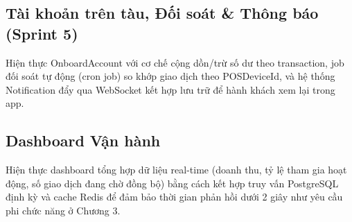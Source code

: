 \subsection{Tài khoản trên tàu, Đối soát \& Thông báo (Sprint 5)}
Hiện thực OnboardAccount với cơ chế cộng dồn/trừ số dư theo transaction,
job đối soát tự động (cron job) so khớp giao dịch theo POSDeviceId, và
hệ thống Notification đẩy qua WebSocket kết hợp lưu trữ để hành khách xem
lại trong app.

\subsection{Dashboard Vận hành}
Hiện thực dashboard tổng hợp dữ liệu real-time (doanh thu, tỷ lệ tham gia
hoạt động, số giao dịch đang chờ đồng bộ) bằng cách kết hợp truy vấn
PostgreSQL định kỳ và cache Redis để đảm bảo thời gian phản hồi dưới 2
giây như yêu cầu phi chức năng ở Chương 3.